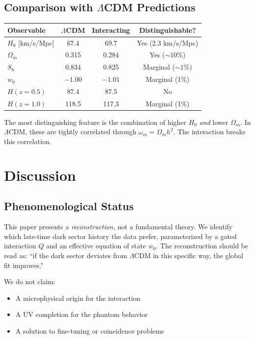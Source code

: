 \documentclass[twocolumn,showpacs,preprintnumbers,amsmath,amssymb,prd]{revtex4-2}
\begin{document}
\subsection{Comparison with $\Lambda$CDM Predictions}

\begin{center}
\begin{tabular}{lccc}
\toprule
Observable & $\Lambda$CDM & Interacting & Distinguishable? \\
\midrule
$H_0$ [km/s/Mpc] & 67.4 & 69.7 & Yes (2.3 km/s/Mpc) \\
$\Omega_m$ & 0.315 & 0.284 & Yes ($\sim 10\%$) \\
$S_8$ & 0.834 & 0.825 & Marginal ($\sim 1\%$) \\
$w_0$ & $-1.00$ & $-1.01$ & Marginal (1\%) \\
$H(z=0.5)$ & 87.4 & 87.5 & No \\
$H(z=1.0)$ & 118.5 & 117.3 & Marginal (1\%) \\
\bottomrule
\end{tabular}
\end{center}

The most distinguishing feature is the combination of higher $H_0$ \textit{and} lower $\Omega_m$. In $\Lambda$CDM, these are tightly correlated through $\omega_m = \Omega_m h^2$. The interaction breaks this correlation.

\section{Discussion}
\label{sec:discussion}

\subsection{Phenomenological Status}

This paper presents a \textit{reconstruction}, not a fundamental theory. We identify which late-time dark sector history the data prefer, parameterized by a gated interaction $Q$ and an effective equation of state $w_0$. The reconstruction should be read as: ``if the dark sector deviates from $\Lambda$CDM in this specific way, the global fit improves.''

We do not claim:
\begin{itemize}
    \item A microphysical origin for the interaction
    \item A UV completion for the phantom behavior
    \item A solution to fine-tuning or coincidence problems
\end{itemize}
\end{document}
